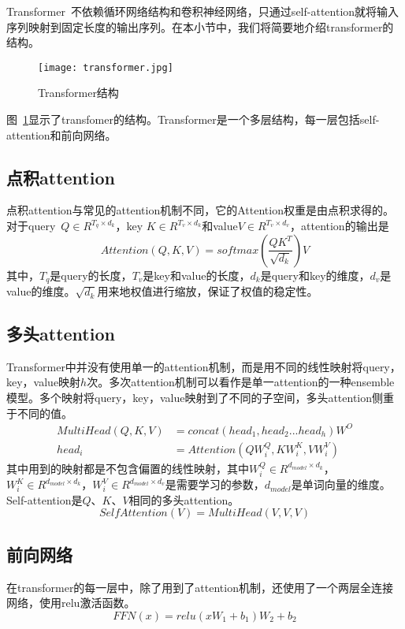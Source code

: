 Transformer~\cite{NIPS2017_7181}不依赖循环网络结构和卷积神经网络，只通过self-attention就将输入序列映射到固定长度的输出序列。在本小节中，我们将简要地介绍transformer的结构。

\begin{figure}[ht]
    \centering 
    \texttt{[image: transformer.jpg]}
    \caption{Transformer结构}
    \label{fig:transformer}
\end{figure}

图~\ref{fig:transformer}显示了transfomer的结构。Transformer是一个多层结构，每一层包括self-attention和前向网络。

\subsection{点积attention}

点积attention与常见的attention机制不同，它的Attention权重是由点积求得的。对于query~$Q\in R^{T_q\times d_k}$，key $K\in R^{T_v\times d_k}$和value$V\in R^{T_v\times d_v}$，attention的输出是
\begin{equation}
    Attention(Q,K,V)=softmax(\frac{QK^T}{\sqrt{d_k}})V
\end{equation}
其中，$T_q$是query的长度，$T_v$是key和value的长度，$d_k$是query和key的维度，$d_v$是value的维度。$\sqrt{d_k}$用来地权值进行缩放，保证了权值的稳定性。
\subsection{多头attention}
Transformer中并没有使用单一的attention机制，而是用不同的线性映射将query，key，value映射$h$次。多次attention机制可以看作是单一attention的一种ensemble模型。多个映射将query，key，value映射到了不同的子空间，多头attention侧重于不同的值。
\begin{equation}
    \begin{aligned}
        MultiHead(Q,K,V)&=concat(head_1,head_2...head_h)W^O\\
        head_i&=Attention(QW^Q_i,KW^K_i,VW^V_i)
    \end{aligned}
\end{equation}
其中用到的映射都是不包含偏置的线性映射，其中$W^Q_i\in R^{d_{model}\times d_k}$，$W^K_i\in R^{d_{model}\times d_k}$，$W^V_i\in R^{d_{model}\times d_v}$是需要学习的参数，$d_{model}$是单词向量的维度。
Self-attention是$Q$、$K$、$V$相同的多头attention。
\begin{equation}
    SelfAttention(V)=MultiHead(V,V,V)
\end{equation}
\subsection{前向网络}
在transformer的每一层中，除了用到了attention机制，还使用了一个两层全连接网络，使用relu激活函数。
\begin{equation}
    FFN(x)=relu(xW_1+b_1)W_2+b_2
\end{equation}
